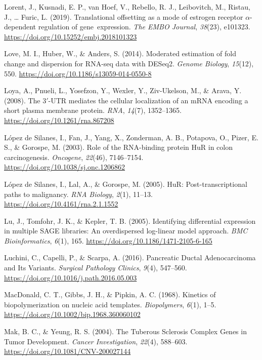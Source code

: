 \documentclass[12pt,openany]{book}
\begin{document}
\hypertarget{ref-Lorent2019}{}
Lorent, J., Kusnadi, E. P., van Hoef, V., Rebello, R. J., Leibovitch,
M., Ristau, J., \ldots{} Furic, L. (2019). Translational offsetting as a
mode of estrogen receptor \(\alpha\)-dependent regulation of
gene~expression. \emph{The EMBO Journal}, \emph{38}(23), e101323.
\url{https://doi.org/10.15252/embj.2018101323}

\hypertarget{ref-Love2014}{}
Love, M. I., Huber, W., \& Anders, S. (2014). Moderated estimation of
fold change and dispersion for RNA-seq data with DESeq2. \emph{Genome
Biology}, \emph{15}(12), 550.
\url{https://doi.org/10.1186/s13059-014-0550-8}

\hypertarget{ref-Loya2008}{}
Loya, A., Pnueli, L., Yosefzon, Y., Wexler, Y., Ziv-Ukelson, M., \&
Arava, Y. (2008). The 3\({'}\)-UTR mediates the cellular localization of
an mRNA encoding a short plasma membrane protein. \emph{RNA},
\emph{14}(7), 1352--1365. \url{https://doi.org/10.1261/rna.867208}

\hypertarget{ref-LopezdeSilanes2003}{}
López de Silanes, I., Fan, J., Yang, X., Zonderman, A. B., Potapova, O.,
Pizer, E. S., \& Gorospe, M. (2003). Role of the RNA-binding protein HuR
in colon carcinogenesis. \emph{Oncogene}, \emph{22}(46), 7146--7154.
\url{https://doi.org/10.1038/sj.onc.1206862}

\hypertarget{ref-LopezdeSilanes2005}{}
López de Silanes, I., Lal, A., \& Gorospe, M. (2005). HuR:
Post-transcriptional paths to malignancy. \emph{RNA Biology},
\emph{2}(1), 11--13. \url{https://doi.org/10.4161/rna.2.1.1552}

\hypertarget{ref-Lu2005}{}
Lu, J., Tomfohr, J. K., \& Kepler, T. B. (2005). Identifying
differential expression in multiple SAGE libraries: An overdispersed
log-linear model approach. \emph{BMC Bioinformatics}, \emph{6}(1), 165.
\url{https://doi.org/10.1186/1471-2105-6-165}

\hypertarget{ref-Luchini2016}{}
Luchini, C., Capelli, P., \& Scarpa, A. (2016). Pancreatic Ductal
Adenocarcinoma and Its Variants. \emph{Surgical Pathology Clinics},
\emph{9}(4), 547--560. \url{https://doi.org/10.1016/j.path.2016.05.003}

\hypertarget{ref-MacDonald1968}{}
MacDonald, C. T., Gibbs, J. H., \& Pipkin, A. C. (1968). Kinetics of
biopolymerization on nucleic acid templates. \emph{Biopolymers},
\emph{6}(1), 1--5. \url{https://doi.org/10.1002/bip.1968.360060102}

\hypertarget{ref-Mak2004}{}
Mak, B. C., \& Yeung, R. S. (2004). The Tuberous Sclerosis Complex Genes
in Tumor Development. \emph{Cancer Investigation}, \emph{22}(4),
588--603. \url{https://doi.org/10.1081/CNV-200027144}
\end{document}
